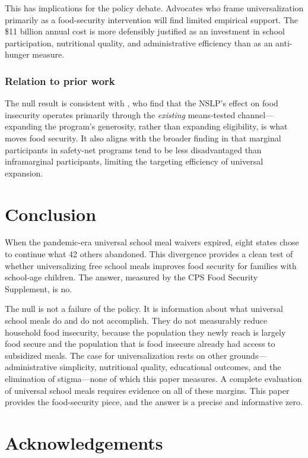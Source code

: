 \documentclass[12pt]{article}
\begin{document}
This has implications for the policy debate. Advocates who frame universalization primarily as a food-security intervention will find limited empirical support. The \$11 billion annual cost \citep{ruffini2022universal} is more defensibly justified as an investment in school participation, nutritional quality, and administrative efficiency than as an anti-hunger measure.

\subsubsection*{Relation to prior work} The null result is consistent with \citet{smith2017effect}, who find that the NSLP's effect on food insecurity operates primarily through the \emph{existing} means-tested channel---expanding the program's generosity, rather than expanding eligibility, is what moves food security. It also aligns with the broader finding in \citet{finkelstein2019take} that marginal participants in safety-net programs tend to be less disadvantaged than inframarginal participants, limiting the targeting efficiency of universal expansion.


\section{Conclusion}
\label{sec:conclusion}

When the pandemic-era universal school meal waivers expired, eight states chose to continue what 42 others abandoned. This divergence provides a clean test of whether universalizing free school meals improves food security for families with school-age children. The answer, measured by the CPS Food Security Supplement, is no.

The null is not a failure of the policy. It is information about what universal school meals do and do not accomplish. They do not measurably reduce household food insecurity, because the population they newly reach is largely food secure and the population that is food insecure already had access to subsidized meals. The case for universalization rests on other grounds---administrative simplicity, nutritional quality, educational outcomes, and the elimination of stigma---none of which this paper measures. A complete evaluation of universal school meals requires evidence on all of these margins. This paper provides the food-security piece, and the answer is a precise and informative zero.

\section*{Acknowledgements}
\end{document}
